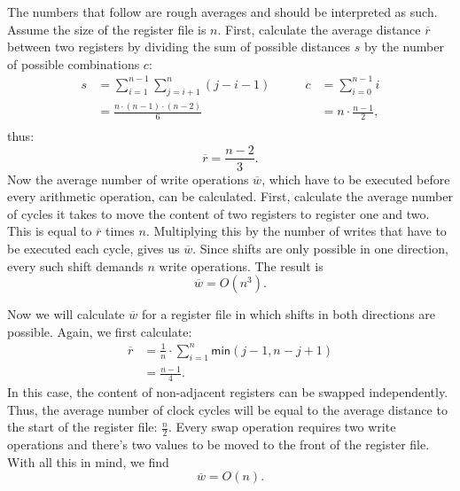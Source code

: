 The numbers that follow are rough averages and should be interpreted as such. Assume the size of the register file is $n$. First, calculate the average distance $\overline{r}$ between two registers by dividing the sum of possible distances $s$ by the number of possible combinations $c$:
\begin{displaymath}\begin{aligned}
	s	&= \sum_{i = 1}^{n - 1} \sum_{j = i + 1}^n (j - i - 1)
		&\qquad c	&= \sum_{i = 0}^{n - 1} i\\
		&= \frac{n \cdot (n - 1) \cdot (n - 2)}{6}
		&	&= n \cdot \frac{n - 1}{2},\\
\end{aligned}\end{displaymath}
thus:
\begin{displaymath}\overline{r}	= \frac{n - 2}{3}.\end{displaymath}
Now the average number of write operations $\overline{w}$, which have to be executed before every arithmetic operation, can be calculated. First, calculate the average number of cycles it takes to move the content of two registers to register one and two. This is equal to $\overline{r}$ times $n$. Multiplying this by the number of writes that have to be executed each cycle, gives us $\overline w$. Since shifts are only possible in one direction, every such shift demands $n$ write operations. The result is
\begin{displaymath}
	\overline{w} = O ( n^3 ).
\end{displaymath}

Now we will calculate $\overline{w}$ for a register file in which shifts in both directions are possible. Again, we first calculate:
\begin{displaymath}\begin{aligned}
	\overline{r}	&= \frac{1}{n} \cdot \sum_{i = 1}^{n} \textsf{min}(j - 1, n - j + 1)\\
						&= \frac{n - 1}{4}.
\end{aligned}\end{displaymath}
In this case, the content of non-adjacent registers can be swapped independently. Thus, the average number of clock cycles will be equal to the average distance to the start of the register file: $\frac{n}{2}$. Every swap operation requires two write operations and there's two values to be moved to the front of the register file. With all this in mind, we find
\begin{displaymath}\overline{w} = O(n).\end{displaymath}

